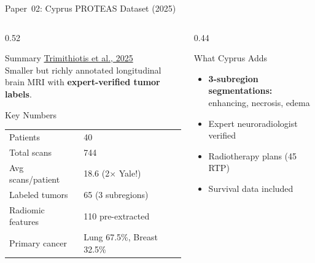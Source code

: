 \documentclass[aspectratio=169,xcolor=dvipsnames]{beamer}
\begin{document}
\begin{frame}{Paper~02: Cyprus PROTEAS Dataset (2025)}
    \begin{columns}
        \begin{column}{0.52\textwidth}
            \begin{block}{Summary}
                \small
                \href{https://doi.org/10.5281/zenodo.17253793}{Trimithiotis et al., 2025}\\[0.3em]
                Smaller but richly annotated longitudinal brain MRI with \textbf{expert-verified tumor labels}.
            \end{block}

            \vspace{0.2em}

            \begin{block}{Key Numbers}
                \small
                \begin{tabular}{ll}
                    Patients & 40 \\
                    Total scans & 744 \\
                    Avg scans/patient & 18.6 (2$\times$ Yale!) \\
                    Labeled tumors & 65 (3 subregions) \\
                    Radiomic features & 110 pre-extracted \\
                    Primary cancer & Lung 67.5\%, Breast 32.5\% \\
                \end{tabular}
            \end{block}
        \end{column}

        \begin{column}{0.44\textwidth}
            \begin{block}{What Cyprus Adds}
                \small
                \begin{itemize}
                    \item \textbf{3-subregion segmentations:} enhancing, necrosis, edema
                    \item Expert neuroradiologist verified
                    \item Radiotherapy plans (45 RTP)
                    \item Survival data included
                \end{itemize}
            \end{block}


\end{column}
\end{columns}
\end{frame}
\end{document}
